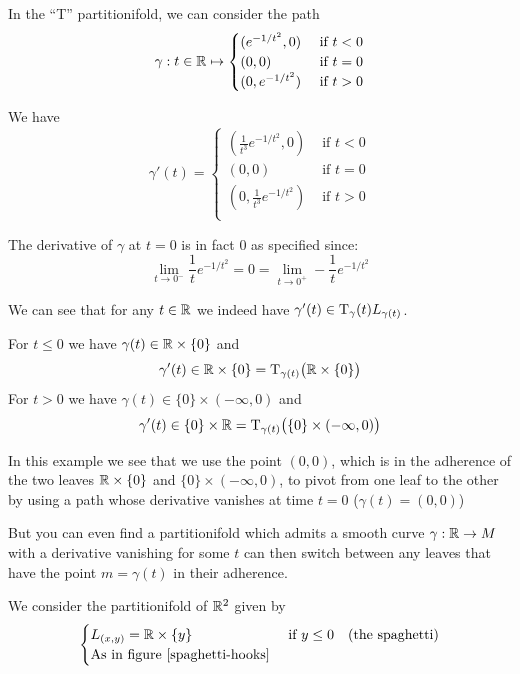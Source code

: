 	\begin{example}
		In the ``T'' partitionifold, we can consider the path
		$$
			\gamma: t \in \mathbb{R} \mapsto
			\begin{cases}
				(e^{-1/t^2}, 0)  &\text{ if } t < 0 \\
				(0, 0)           &\text{ if } t = 0 \\
				(0, e^{-1/t^2})  &\text{ if } t > 0 \\
			\end{cases}
		$$

		We have
		$$
			\gamma'(t) =
			\begin{cases}
				(\frac{1}{t^3} e^{-1/t^2}, 0)  &\text{ if } t < 0 \\
				(0, 0)                         &\text{ if } t = 0 \\
				(0, \frac{1}{t^3} e^{-1/t^2})  &\text{ if } t > 0 \\
			\end{cases}
		$$
		
		The derivative of $\gamma$ at $t=0$ is in fact $0$ as specified since:
		$$
			\lim_{t \to 0^-} \frac{1}{t} e^{-1/t^2} = 0 = \lim_{t \to 0^+} -\frac{1}{t} e^{-1/t^2}
		$$

		We can see that for any $t \in \mathbb{R}$ we indeed have $\gamma'(t) \in \mathrm{T}_\gamma(t) L_{\gamma(t)}$.
        
		For $t \leq 0$ we have $\gamma(t) \in \mathbb{R} \times \{0\}$ and
		$$
			\gamma'(t) \in \mathbb{R} \times \{0\} = \mathrm{T}_{\gamma(t)}\big( \mathbb{R} \times \{0\} \big)
		$$
		For $t > 0$ we have $\gamma(t) \in \{0\} \times (-\infty, 0)$ and
		$$
			\gamma'(t) \in \{0\} \times \mathbb{R} = \mathrm{T}_{\gamma(t)}\big( \{0\} \times (-\infty, 0) \big)
		$$
	\end{example}

	In this example we see that we use the point $(0,0)$, which is in the adherence of the two leaves $\mathbb{R} \times \{0\}$ and $\{0\} \times (-\infty, 0)$, to pivot from one leaf to the other by using a path whose derivative vanishes at time $t=0$ ($\gamma(t) = (0,0)$)

	But you can even find a partitionifold which admits a smooth curve $\gamma: \mathbb{R} \to M$ with a derivative vanishing for some $t$ can then switch between any leaves that have the point $m = \gamma(t)$ in their adherence.

	\begin{example}
		We consider the partitionifold of $\mathbb{R}^2$ given by
		$$
		\begin{cases}
			L_{(x,y)} = \mathbb{R} \times \{y\}            &\text{ if } y \leq 0 \quad \text{(the spaghetti)} \\
			\text{As in figure \ref{spaghetti-hooks}}
		\end{cases}
		$$
	\end{example}

